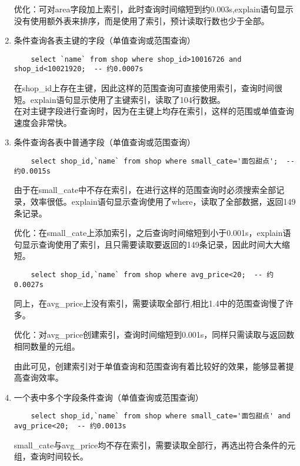 \documentclass[a4paper, 11pt, nofonts, nocap, fancyhdr]{ctexart}
\begin{document}
\begin{enumerate}
优化：可对area字段加上索引，此时查询时间缩短到约0.003s,explain语句显示没有使用额外表来排序，而是使用了索引，预计读取行数也少于全部。\\

	\item 条件查询各表主键的字段（单值查询或范围查询）

	\begin{lstlisting}
	select `name` from shop where shop_id>10016726 and shop_id<10021920;  -- 约0.0007s
	\end{lstlisting}
在shop_id上存在主键，因此这样的范围查询可直接使用索引，查询时间很短。explain语句显示使用了主键索引，读取了104行数据。\\

在对主键字段进行查询时，因为在主键上均存在索引，这样的范围或单值查询速度会非常快。\\

	\item 条件查询各表中普通字段（单值查询或范围查询）
	
	\begin{lstlisting}
	select shop_id,`name` from shop where small_cate='面包甜点';  -- 约0.0015s
	\end{lstlisting}
由于在small_cate中不存在索引，在进行这样的范围查询时必须搜索全部记录，效率很低。explain语句显示查询使用了where，读取了全部数据，返回149条记录。

优化：在small_cate上添加索引，之后查询时间缩短到小于0.001s，explain语句显示查询使用了索引，且只需要读取要返回的149条记录，因此时间大大缩短。

	\begin{lstlisting}
	select shop_id,`name` from shop where avg_price<20;  -- 约0.0027s
	\end{lstlisting}
同上，在avg_price上没有索引，需要读取全部行,相比1.4中的范围查询慢了许多。

优化：对avg_price创建索引，查询时间缩短到0.001s，同样只需读取与返回数相同数量的元组。

由此可见，创建索引对于单值查询和范围查询有着比较好的效果，能够显著提高查询效率。\\

	\item 一个表中多个字段条件查询（单值查询或范围查询）
	
	\begin{lstlisting}
	select shop_id,`name` from shop where small_cate='面包甜点' and avg_price<20;  -- 约0.0013s
	\end{lstlisting}
small_cate与avg_price均不存在索引，需要读取全部行，再选出符合条件的元组，查询时间较长。


\end{enumerate}
\end{document}
